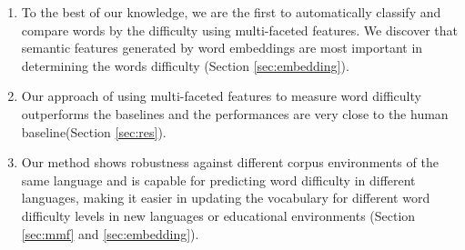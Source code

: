 
\begin{enumerate}
	\item To the best of our knowledge, we are the first to automatically classify and compare words by the difficulty using multi-faceted features.
	We discover that semantic features generated by word embeddings are most important in determining the words difficulty (Section \ref{sec:embedding}).
	\item Our approach of using multi-faceted features to measure word difficulty outperforms the baselines and the performances are very close to the human baseline(Section \ref{sec:res}).
	\item Our method shows robustness against different corpus environments of the same language and is capable for predicting word difficulty in different languages, making it easier in updating the vocabulary for different word difficulty levels in new languages or 
	educational environments (Section \ref{sec:mmf} and \ref{sec:embedding}).
\end{enumerate}

